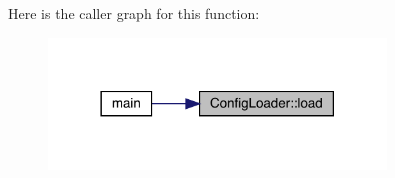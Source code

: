 Here is the caller graph for this function\+:\nopagebreak
\begin{figure}[H]
\begin{center}
\leavevmode
\includegraphics[width=254pt]{namespace_config_loader_a26cf01adba9411ef1fa006d5068d7cc4_icgraph}
\end{center}
\end{figure}
